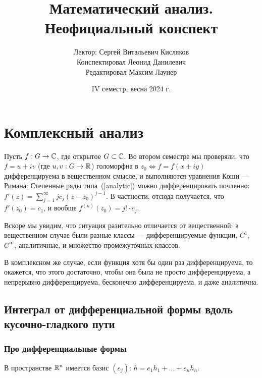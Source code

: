 \documentclass[a4paper]{report}
\date{IV семестр, весна 2024 г.}
\title{Математический анализ. Неофициальный конспект}
\author{Лектор: Сергей Витальевич Кисляков \\ Конспектировал Леонид Данилевич \\ Редактировал Максим Лаунер}
\begin{document}
    \maketitle
    \tableofcontents
    \newpage
    \setcounter{lection}{0}
    \chapter{Комплексный анализ}
    Пусть $f: G \rightarrow \mathbb{C}$, где открытое $G \subset \mathbb{C}$.
    Во втором семестре мы проверяли, что $f = u + iv$ (где $u, v: G \rightarrow \mathbb{R}$) голоморфна в $z_0 \iff f = f(x + iy)$ дифференцируема в вещественном смысле, и выполняются уравнения Коши --- Римана:
    Степенные ряды типа~(\ref{analytic}) можно дифференцировать почленно: $f'(z) = \sum\limits_{j = 1}^{\infty}j c_j (z - z_0)^{j - 1}$.
    В частности, отсюда получается, что $f'(z_0) = c_1$, и вообще $f^{(n)}(z_0) = j! \cdot c_j$.

    Вскоре мы увидим, что ситуация разительно отличается от вещественной: в вещественном случае были разные классы --- дифференцируемые функции, $C^1$, $C^\infty$, аналитичные, и множество промежуточных классов.

    В комплексном же случае, если функция хотя бы один раз дифференцируема, то окажется, что этого достаточно, чтобы она была не просто дифференцируема, а непрерывно дифференцируема, бесконечно дифференцируема, и даже аналитична.
    \section{Интеграл от дифференциальной формы вдоль кусочно-гладкого пути}
    \subsection{Про дифференциальные формы}
    В пространстве $\mathbb{R}^n$ имеется базис $(e_j)$: $h = e_1 h_1 + \dots + e_n h_n$.
\end{document}
